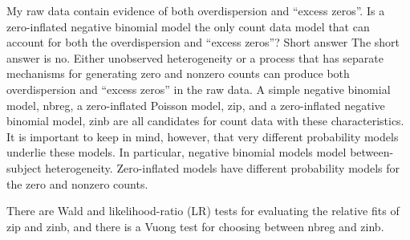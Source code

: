 My raw data contain evidence of both overdispersion and “excess zeros”. Is a zero-inflated negative binomial model the only count data model that can account for both the overdispersion and “excess zeros”? 
Short answer
 The short answer is no. Either unobserved heterogeneity or a process that has separate mechanisms for generating zero and nonzero counts can produce both overdispersion and “excess zeros” in the raw data. A simple negative binomial model, nbreg, a zero-inflated Poisson model, zip, and a zero-inflated negative binomial model, zinb are all candidates for count data with these characteristics. It is important to keep in mind, however, that very different probability models underlie these models. In particular, negative binomial models model between-subject heterogeneity. Zero-inflated models have different probability models for the zero and nonzero counts.
 
There are Wald and likelihood-ratio (LR) tests for evaluating the relative fits of zip and zinb, and there is a Vuong test for choosing between nbreg and zinb.
 
 
 
 
